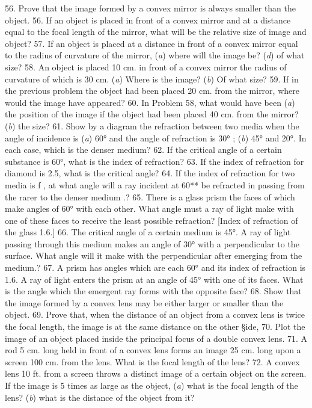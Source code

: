 56. Prove that the image formed by a convex mirror is always smaller than the object.
56. If an object is placed in front of a convex mirror and at a distance equal to the focal length of the mirror, what will be the relative size of image and object?
57. If an object is placed at a distance in front of a convex mirror equal to the radius of curvature of the mirror, (\emph{a}) where will the image be? (\emph{d}) of what size?
58. An object is placed 10 cm. in front of a convex mirror the radius of curvature of which is 30 cm. (\emph{a}) Where is the image? (\emph{b}) Of what size?
59. If in the previous problem the object had been placed 20 cm. from the mirror, where would the image have appeared?
60. In Problem 58, what would have been (\emph{a}) the position of the image if the object had been placed 40 cm. from the mirror? (\emph{b}) the size?
61. Show by a diagram the refraction between two media when the angle of incidence is (\emph{a}) 60° and the angle of refraction is 30° ; (\emph{b}) 45° and 20°. In each case, which is the denser medium?
62. If the critical angle of a certain substance is 60°, what is the index of refraction?
63. If the index of refraction for diamond is 2.5, what is the critical angle?
64. If the index of refraction for two media is f , at what angle will a ray incident at 60** be refracted in passing from the rarer to the denser medium .?
65. There is a glass prism the faces of which make angles of 60° with each other. What angle must a ray of light make with one of these faces to receive the least possible refraction? [Index of refraction of the glass 1.6.]
66. The critical angle of a certain medium is 45°. A ray of light passing through this medium makes an angle of 30° with a perpendicular to the surface. What angle will it make with the perpendicular after emerging from the medium.?
67. A prism has angles which are each 60° and its index of refraction is 1.6. A ray of light enters the prism at an angle of 45° with one of its faces. What is the angle which the emergent ray forms with the opposite face?
68. Show that the image formed by a convex lens may be either larger or smaller than the object.
69. Prove that, when the distance of an object from a convex lens is twice the focal length, the image is at the same distance on the other §ide,
70. Plot the image of an object placed inside the principal focus of a double convex lens.
71. A rod 5 cm. long held in front of a convex lens forms an image 25 cm. long upon a screen 100 cm. from the lens. What is the focal length of the lens?
72. A convex lens 10 ft. from a screen throws a distinct image of a certain object on the screen. If the image is 5 times as large as the object, (\emph{a}) what is the focal length of the lens? (\emph{b}) what is the distance of the object from it?
